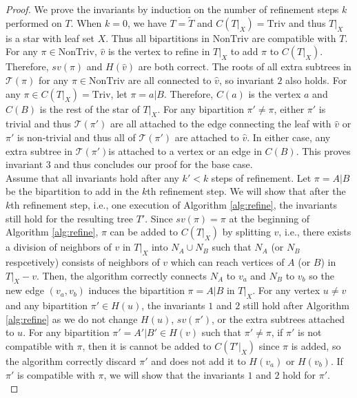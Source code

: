 \documentclass{bmcart}
\newcommand{\triv}{\mathrm{Triv}}
\newcommand{\ntriv}{\mathrm{NonTriv}}
\begin{document}
\begin{proof}
    We prove the invariants by induction on the number of refinement steps $k$ performed on $T$. When $k=0$, we have $T = \tilde{T}$ and $C(T|_X) = \triv$ and thus $T|_X$ is a star with leaf set $X$. Thus all bipartitions in $\ntriv$ are compatible with $T$. For any $\pi \in \ntriv $, $\hat{v}$ is the vertex to refine in $T|_X$ to add $\pi$ to $C(T|_X)$. Therefore, $sv(\pi)$ and $H(\hat{v})$ are both correct. The roots of all extra subtrees in $\mathcal{T}(\pi)$ for any $\pi \in \ntriv$ are all connected to $\hat{v}$, so invariant $2$ also holds. For any $\pi \in C(T|_X) = \triv$, let $\pi = {a}|B$. Therefore, $C({a})$ is the vertex $a$ and $C(B)$ is the rest of the star of $T|_X$. For any bipartition $\pi' \neq \pi$, either $\pi'$ is trivial and thus $\mathcal{T}(\pi')$ are all attached to the edge connecting the leaf with $\hat{v}$ or $\pi'$ is non-trivial and thus all of $\mathcal{T}(\pi')$ are attached to $\hat{v}$. In either case, any extra subtree in $\mathcal{T}(\pi')$is attached to a vertex or an edge in $C(B)$. This proves invariant $3$ and thus concludes our proof for the base case.\\ 
    
    Assume that all invariants hold after any $k' < k$ steps of refinement. Let $\pi = A|B$ be the bipartition to add in the $k$th refinement step. We will show that after the $k$th refinement step, i.e., one execution of Algorithm \ref{alg:refine}, the invariants still hold for the resulting tree $T'$. Since $sv(\pi) = \pi$ at the beginning of Algorithm \ref{alg:refine}, $\pi$ can be added to $C(T|_X)$ by splitting $v$, i.e., there exists a division of neighbors of $v$ in $T|_X$ into $N_A \cup N_B$ such that $N_A$ (or $N_B$ respcetively) consists of neighbors of $v$ which can reach vertices of $A$ (or $B$) in $T|_X-v$. Then, the algorithm correctly connects $N_A$ to $v_a$ and $N_B$ to $v_b$ so the new edge $(v_a,v_b)$ induces the bipartition $\pi = A|B$ in $T|_X$. For any vertex $u \neq v$ and any bipartition $\pi' \in H(u)$, the invariants $1$ and $2$ still hold after Algorithm \ref{alg:refine} as we do not change $H(u)$, $sv(\pi')$, or the extra subtrees attached to $u$. For any bipartition $\pi' = A'|B' \in H(v)$ such that $\pi' \neq \pi$, if $\pi'$ is not compatible with $\pi$, then it is cannot be added to $C(T'|_X)$ since $\pi$ is added, so the algorithm correctly discard $\pi'$ and does not add it to $H(v_a)$ or $H(v_b)$. If $\pi'$ is compatible with $\pi$, we will show that the invariants $1$ and $2$ hold for $\pi'$.\\
    

\end{proof}
\end{document}
